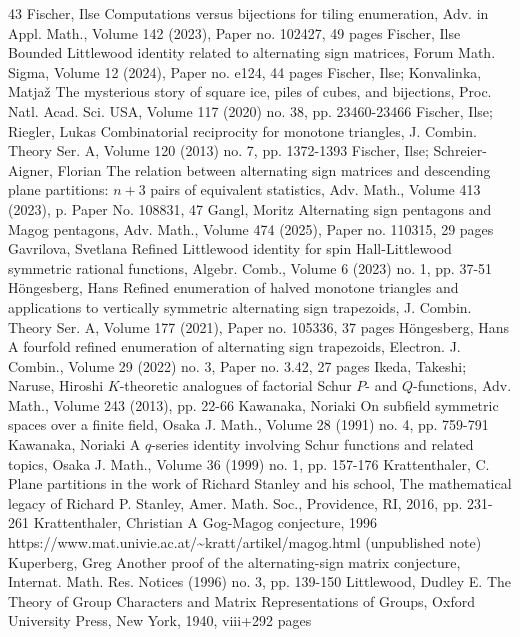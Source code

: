 \documentclass[10pt,a4paper]{article}
\theoremstyle{definition}
\begin{document}
\begin{thebibliography}{43}
 Fischer, Ilse Computations versus bijections for tiling enumeration, Adv. in Appl. Math., Volume 142 (2023), Paper no. 102427, 49 pages
 Fischer, Ilse Bounded Littlewood identity related to alternating sign matrices, Forum Math. Sigma, Volume 12 (2024), Paper no. e124, 44 pages
 Fischer, Ilse; Konvalinka, Matjaž The mysterious story of square ice, piles of cubes, and bijections, Proc. Natl. Acad. Sci. USA, Volume 117 (2020) no. 38, pp. 23460-23466
 Fischer, Ilse; Riegler, Lukas Combinatorial reciprocity for monotone triangles, J. Combin. Theory Ser. A, Volume 120 (2013) no. 7, pp. 1372-1393
 Fischer, Ilse; Schreier-Aigner, Florian The relation between alternating sign matrices and descending plane partitions: $n + 3$ pairs of equivalent statistics, Adv. Math., Volume 413 (2023), p. Paper No. 108831, 47
 Gangl, Moritz Alternating sign pentagons and Magog pentagons, Adv. Math., Volume 474 (2025), Paper no. 110315, 29 pages
 Gavrilova, Svetlana Refined Littlewood identity for spin Hall-Littlewood symmetric rational functions, Algebr. Comb., Volume 6 (2023) no. 1, pp. 37-51
 Höngesberg, Hans Refined enumeration of halved monotone triangles and applications to vertically symmetric alternating sign trapezoids, J. Combin. Theory Ser. A, Volume 177 (2021), Paper no. 105336, 37 pages
 Höngesberg, Hans A fourfold refined enumeration of alternating sign trapezoids, Electron. J. Combin., Volume 29 (2022) no. 3, Paper no. 3.42, 27 pages
 Ikeda, Takeshi; Naruse, Hiroshi ${K}$-theoretic analogues of factorial Schur ${P}$- and ${Q}$-functions, Adv. Math., Volume 243 (2013), pp. 22-66
 Kawanaka, Noriaki On subfield symmetric spaces over a finite field, Osaka J. Math., Volume 28 (1991) no. 4, pp. 759-791
 Kawanaka, Noriaki A $q$-series identity involving Schur functions and related topics, Osaka J. Math., Volume 36 (1999) no. 1, pp. 157-176
 Krattenthaler, C. Plane partitions in the work of Richard Stanley and his school, The mathematical legacy of Richard P. Stanley, Amer. Math. Soc., Providence, RI, 2016, pp. 231-261
 Krattenthaler, Christian A Gog-Magog conjecture, 1996 https://www.mat.univie.ac.at/\textasciitilde{}kratt/artikel/magog.html (unpublished note)
 Kuperberg, Greg Another proof of the alternating-sign matrix conjecture, Internat. Math. Res. Notices (1996) no. 3, pp. 139-150
 Littlewood, Dudley E. The Theory of Group Characters and Matrix Representations of Groups, Oxford University Press, New York, 1940, viii+292 pages

\end{thebibliography}
\end{document}
